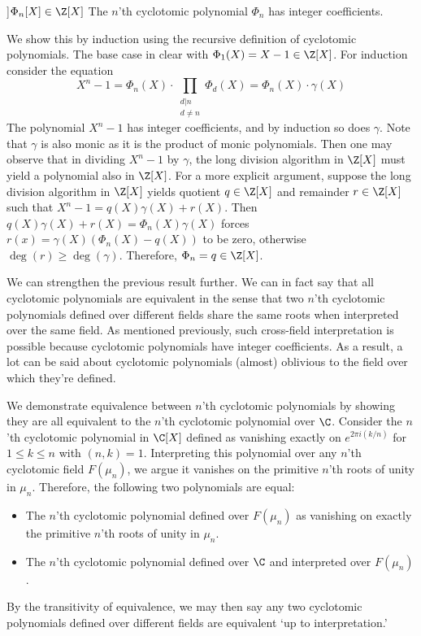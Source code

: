 \begin{theorem}[Phi_n(X) is in Z[X]]{$\Phi_n[X]\in\Z[X]$}
    The $n$'th cyclotomic polynomial $\Phi_n$ has integer coefficients.

    \proof
    We show this by induction using the recursive definition of cyclotomic polynomials.
    The base case in clear with $\Phi_1(X)=X-1\in\Z[X]$.
    For induction consider the equation
    \begin{equation}
        X^n-1 = \Phi_n(X) \cdot
        \prod_{\substack{d|n\\d\neq n}}\Phi_d(X) = \Phi_n(X)\cdot\gamma(X)
    \end{equation}
    The polynomial $X^n-1$ has integer coefficients, and by induction so does $\gamma$.
    Note that $\gamma$ is also monic as it is the product of monic polynomials.
    Then one may observe that in dividing $X^n-1$ by $\gamma$, the long division algorithm in $\Z[X]$ must yield a polynomial also in $\Z[X]$.
    For a more explicit argument, suppose the long division algorithm in $\Z[X]$ yields quotient $q\in\Z[X]$ and remainder $r\in\Z[X]$ such that $X^n-1=q(X)\gamma(X)+r(X)$.
    Then $q(X)\gamma(X)+r(X)=\Phi_n(X)\gamma(X)$ forces $r(x)=\gamma(X)(\Phi_n(X)-q(X))$ to be zero, otherwise $\deg(r)\geq\deg(\gamma)$.
    Therefore, $\Phi_n=q\in\Z[X]$.
\end{theorem}

We can strengthen the previous result further.
We can in fact say that all cyclotomic polynomials are equivalent in the sense that two $n$'th cyclotomic polynomials defined over different fields share the same roots when interpreted over the same field.
As mentioned previously, such cross-field interpretation is possible because cyclotomic polynomials have integer coefficients.
As a result, a lot can be said about cyclotomic polynomials (almost) oblivious to the field over which they're defined.

We demonstrate equivalence between $n$'th cyclotomic polynomials by showing they are all equivalent to the $n$'th cyclotomic polynomial over $\C$.
Consider the $n$'th cyclotomic polynomial in $\C[X]$ defined as vanishing exactly on $e^{2\pi i(k/n)}$ for $1\leq k\leq n$ with $(n,k)=1$.
Interpreting this polynomial over any $n$'th cyclotomic field $F(\mu_n)$, we argue it vanishes on the primitive $n$'th roots of unity in $\mu_n$.
Therefore, the following two polynomials are equal:
\begin{itemize}
    \item
    The $n$'th cyclotomic polynomial defined over $F(\mu_n)$ as vanishing on exactly the primitive $n$'th roots of unity in $\mu_n$.
    \item
    The $n$'th cyclotomic polynomial defined over $\C$ and interpreted over $F(\mu_n)$.
\end{itemize}
By the transitivity of equivalence, we may then say any two cyclotomic polynomials defined over different fields are equivalent `up to interpretation.'


